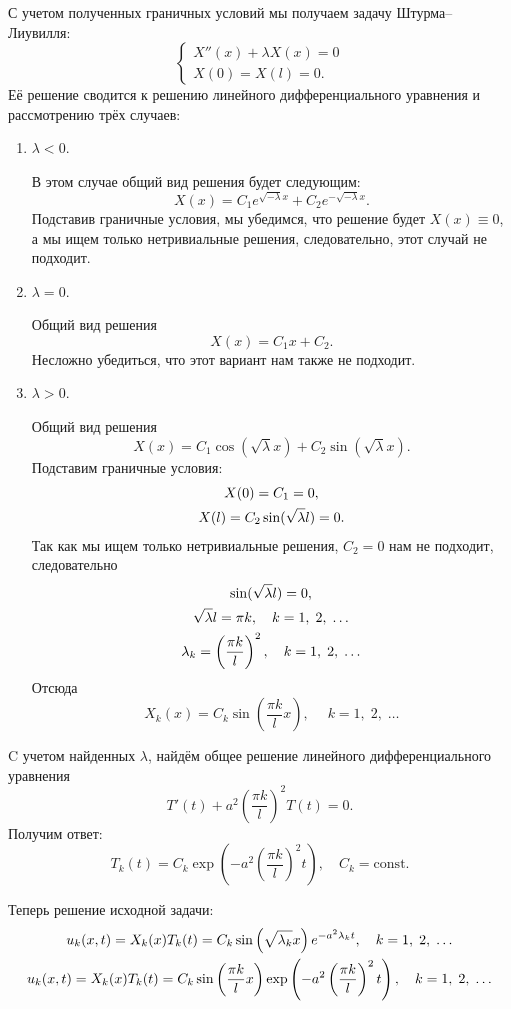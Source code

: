 \documentclass[11pt]{article}
\begin{document}
С учетом полученных граничных условий мы получаем задачу Штурма--Лиувилля:
$$
\left\{
\begin{aligned}
X''(x) + \lambda X(x) = 0 \\
X(0) = X(l) = 0.
\end{aligned}
\right.
$$
Её решение сводится к решению линейного дифференциального уравнения и рассмотрению трёх случаев:
\begin{enumerate}
\item
$\lambda < 0$.

В этом случае общий вид решения будет следующим:
$$
X(x) = C_1 e^{\sqrt{-\lambda}x} + C_2 e^{-\sqrt{-\lambda}x}.
$$
Подставив граничные условия, мы убедимся, что решение будет $X(x)\equiv 0$, а мы ищем только нетривиальные решения, следовательно, этот случай не подходит.

\item
$\lambda = 0$.

Общий вид решения
$$
X(x) = C_1 x + C_2.
$$
Несложно убедиться, что этот вариант нам также не подходит.

\item
$\lambda > 0$.

Общий вид решения
$$
X(x) = C_1 \cos(\sqrt\lambda x) + C_2 \sin(\sqrt\lambda x).
$$
Подставим граничные условия:
\begin{gather}
X(0) = C_1 = 0, \notag \\
X(l) = C_2 \sin(\sqrt\lambda l) = 0. \notag
\end{gather}
Так как мы ищем только нетривиальные решения, $C_2 = 0$ нам не подходит, следовательно
\begin{gather}
\sin(\sqrt\lambda l) = 0, \notag \\
\sqrt\lambda l = \pi k, \quad k = 1, \; 2, \; \ldots \notag \\
\lambda_k = \left(\dfrac{\pi k}{l}\right)^2,\quad k = 1, \; 2, \; \ldots \notag
\end{gather}
Отсюда
$$
X_k(x)=C_k\sin\left(\dfrac{\pi k}{l} x \right),\;\quad k = 1, \; 2, \; \ldots
$$
\end{enumerate}

C учетом найденных $\lambda$, найдём общее решение линейного дифференциального уравнения
$$
T'(t) + a^2 \left(\dfrac{\pi k}{l}\right)^2 T(t)=0.
$$
Получим ответ:
$$
T_k(t)=C_k \exp\left( -a^2\left(\dfrac{\pi k}{l}\right)^2 t \right), \quad C_k = \mathrm{const}.
$$

Теперь решение исходной задачи:
\begin{gather}
u_k(x, t) = X_k(x) T_k(t) = C_k \sin\left( \sqrt{\lambda_k} x \right) e^{-a^2 \lambda_k t}, \quad k = 1, \; 2, \; \ldots \notag \\
u_k(x, t) = X_k(x) T_k(t) = C_k \sin\left(\frac{\pi k}{l} x \right) \exp\left(-a^2\left(\dfrac{\pi k}{l} \right)^2 t \right),\quad k = 1, \; 2, \; \ldots \notag
\end{gather}
\end{document}
